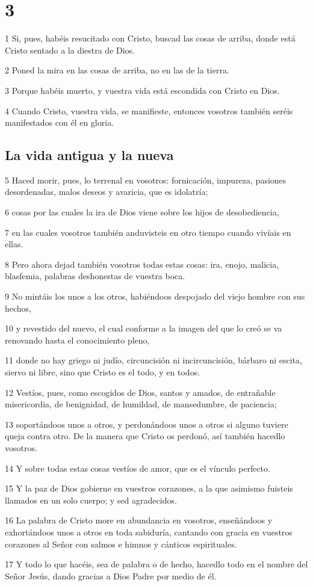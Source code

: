 \chapter{3}

\par 1 Si, pues, habéis resucitado con Cristo, buscad las cosas de arriba, donde está Cristo sentado a la diestra de Dios.
\par 2 Poned la mira en las cosas de arriba, no en las de la tierra.
\par 3 Porque habéis muerto, y vuestra vida está escondida con Cristo en Dios.
\par 4 Cuando Cristo, vuestra vida, se manifieste, entonces vosotros también seréis manifestados con él en gloria.

\section*{La vida antigua y la nueva}

\par 5 Haced morir, pues, lo terrenal en vosotros: fornicación, impureza, pasiones desordenadas, malos deseos y avaricia, que es idolatría;
\par 6 cosas por las cuales la ira de Dios viene sobre los hijos de desobediencia,
\par 7 en las cuales vosotros también anduvisteis en otro tiempo cuando vivíais en ellas.
\par 8 Pero ahora dejad también vosotros todas estas cosas: ira, enojo, malicia, blasfemia, palabras deshonestas de vuestra boca.
\par 9 No mintáis los unos a los otros, habiéndoos despojado del viejo hombre con sus hechos,
\par 10 y revestido del nuevo, el cual conforme a la imagen del que lo creó se va renovando hasta el conocimiento pleno,
\par 11 donde no hay griego ni judío, circuncisión ni incircuncisión, bárbaro ni escita, siervo ni libre, sino que Cristo es el todo, y en todos.
\par 12 Vestíos, pues, como escogidos de Dios, santos y amados, de entrañable misericordia, de benignidad, de humildad, de mansedumbre, de paciencia;
\par 13 soportándoos unos a otros, y perdonándoos unos a otros si alguno tuviere queja contra otro. De la manera que Cristo os perdonó, así también hacedlo vosotros.
\par 14 Y sobre todas estas cosas vestíos de amor, que es el vínculo perfecto.
\par 15 Y la paz de Dios gobierne en vuestros corazones, a la que asimismo fuisteis llamados en un solo cuerpo; y sed agradecidos.
\par 16 La palabra de Cristo more en abundancia en vosotros, enseñándoos y exhortándoos unos a otros en toda sabiduría, cantando con gracia en vuestros corazones al Señor con salmos e himnos y cánticos espirituales.
\par 17 Y todo lo que hacéis, sea de palabra o de hecho, hacedlo todo en el nombre del Señor Jesús, dando gracias a Dios Padre por medio de él.


